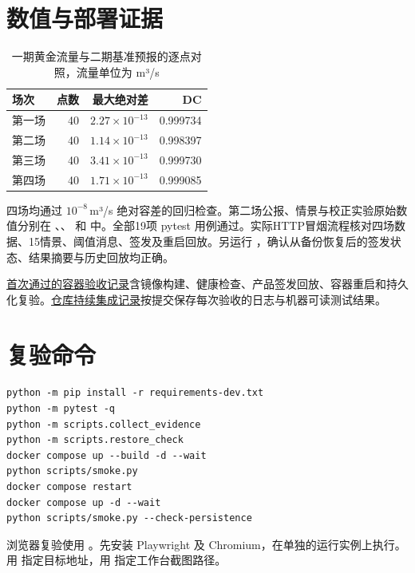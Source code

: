 \section{数值与部署证据}
\begin{table}[htbp]\centering\small\caption{一期黄金流量与二期基准预报的逐点对照，流量单位为 m³/s}
\begin{tabular}{lrrr}\toprule 场次 & 点数 & 最大绝对差 & DC\\\midrule
第一场 &40&$2.27\times10^{-13}$&0.999734\\
第二场 &40&$1.14\times10^{-13}$&0.998397\\
第三场 &40&$3.41\times10^{-13}$&0.999730\\
第四场 &40&$1.71\times10^{-13}$&0.999085\\\bottomrule\end{tabular}\end{table}
四场均通过 $10^{-8}$\,m³/s 绝对容差的回归检查。第二场公报、情景与校正实验原始数值分别在 、、 和  中。全部19项 pytest 用例通过。实际HTTP冒烟流程核对四场数据、15情景、阈值消息、签发及重启回放。另运行 ，确认从备份恢复后的签发状态、结果摘要与历史回放均正确。
\par \href{https://github.com/qiansen0809-droid/qinghe-flood/actions/runs/45525400093}{首次通过的容器验收记录}含镜像构建、健康检查、产品签发回放、容器重启和持久化复验。\href{https://github.com/qiansen0809-droid/qinghe-flood/actions}{仓库持续集成记录}按提交保存每次验收的日志与机器可读测试结果。
\section{复验命令}
\begin{verbatim}
python -m pip install -r requirements-dev.txt
python -m pytest -q
python -m scripts.collect_evidence
python -m scripts.restore_check
docker compose up --build -d --wait
python scripts/smoke.py
docker compose restart
docker compose up -d --wait
python scripts/smoke.py --check-persistence
\end{verbatim}
浏览器复验使用 。先安装 Playwright 及 Chromium，在单独的运行实例上执行。用  指定目标地址，用  指定工作台截图路径。

